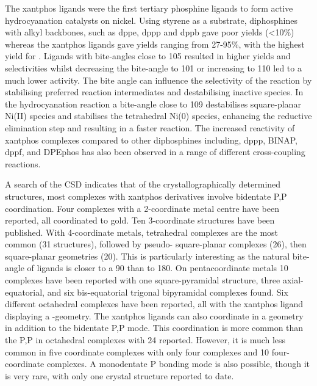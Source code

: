 The xantphos ligands were the first tertiary phosphine ligands to form active hydrocyanation catalysts on nickel.\cite{Kranenburg1995b}  Using styrene as a substrate, diphosphines with alkyl backbones, such as \gls{dppe}, \gls{dppp} and \gls{dppb} gave poor yields (\textless{}10\%) where\-as the xantphos ligands gave yields ranging from 27-95\%, with the highest yield for \Phsixantphos{}.  Ligands with bite-angles close to 105\degrees{} resulted in higher yields and selectivities whilst decreasing the bite-angle to 101\degrees{} or increasing to 110\degrees{} led to a much lower activity.  The bite angle can influence the selectivity of the reaction by stabilising preferred reaction intermediates and destabilising inactive species.   In the hydrocyanation reaction a bite-angle close to 109\degrees{} destabilises square-planar Ni(II) species and stabilises the tetrahedral Ni(0) species, enhancing the reductive elimination step and resulting in a faster reaction.\cite{Goertz1998}  The increased reactivity of xantphos complexes compared to other diphosphines including, \acrshort{dppp}, \acrshort{BINAP}, \acrshort{dppf}, and \acrshort{DPEphos} has also been observed in a range of different cross-coupling reactions.\cite{Birkholz2009}

A search of the \gls{CSD} indicates that of the crystallographically determined structures, most complexes with xantphos derivatives involve bidentate \dento{}P,P\textprime{} coordination.\cite{Allen2002}  Four complexes with a 2-coordinate metal centre have been reported, all coordinated to gold. Ten 3-coordinate structures have been published.  With 4-coordinate metals, tetrahedral complexes are the most common (31 structures), followed by pseudo-\trans{} square-planar complexes (26), then \cis{} square-planar geometries (20).  This is particularly interesting as the natural bite-angle of \Phxantphos{} ligands is closer to a 90\degrees{} than to 180\degrees.  On pentacoordinate metals 10 complexes have been reported with one square-pyramidal structure, three axial-equatorial, and six bis-equatorial trigonal bipyramidal complexes found.  Six different octahedral complexes have been reported, all with the xantphos ligand displaying a \cis{}-geometry.  The xantphos ligands can also coordinate in a \POP{} geometry in addition to the bidentate \dento{}P,P\textprime{} mode.  This \POP{} coordination is more common than the \dento{}P,P\textprime{} in octahedral complexes with 24 reported.  However, it is much less common in five coordinate complexes with only four \POP{} complexes and 10 \POP{} four-coordinate complexes.  A monodentate \dento{}P bonding mode is also possible, though it is very rare, with only one crystal structure reported to date.\cite{Escalle2009}

